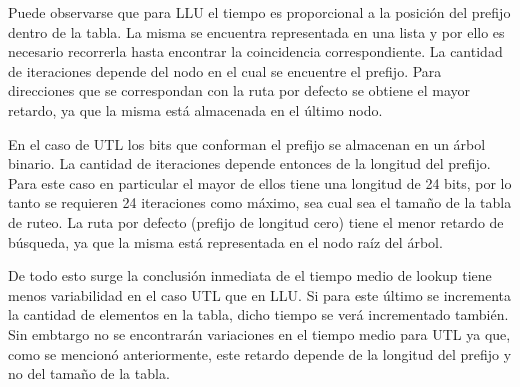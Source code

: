 Puede observarse que para LLU el tiempo es proporcional a la posición del prefijo dentro de la tabla. La misma se encuentra representada en una lista y por ello es necesario recorrerla hasta encontrar la coincidencia correspondiente. La cantidad de iteraciones depende del nodo en el cual se encuentre el prefijo. Para direcciones que se correspondan con la ruta por defecto se obtiene el mayor retardo, ya que la misma está almacenada en el último nodo.

En el caso de UTL los bits que conforman el prefijo se almacenan en un árbol binario. La cantidad de iteraciones depende entonces de la longitud del prefijo. Para este caso en particular el mayor de ellos tiene una longitud de 24 bits, por lo tanto se requieren 24 iteraciones como máximo, sea cual sea el tamaño de la tabla de ruteo. La ruta por defecto (prefijo de longitud cero) tiene el menor retardo de búsqueda, ya que la misma está representada en el nodo raíz del árbol.

De todo esto surge la conclusión inmediata de el tiempo medio de lookup tiene menos variabilidad en el caso UTL que en LLU. Si para este último se incrementa la cantidad de elementos en la tabla, dicho tiempo se verá incrementado también. Sin embtargo no se encontrarán variaciones en el tiempo medio para UTL ya que, como se mencionó anteriormente, este retardo depende de la longitud del prefijo y no del tamaño de la tabla.

\newpage
